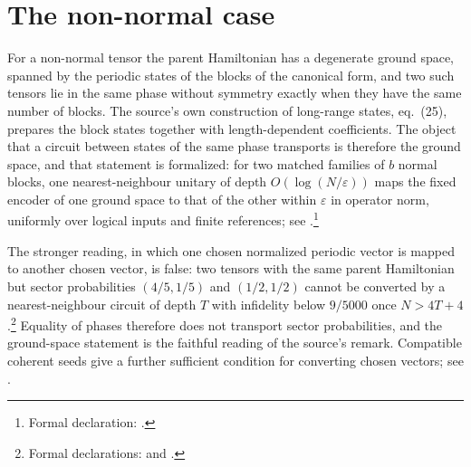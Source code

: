 \documentclass{article}
\begin{document}
\section{The non-normal case}
For a non-normal tensor the parent Hamiltonian has a degenerate ground space,
spanned by the periodic states of the blocks of the canonical form, and two
such tensors lie in the same phase without symmetry exactly when they have the
same number of blocks. The source's own construction of long-range states,
eq.~(25), prepares the block states together with length-dependent
coefficients. The object that a circuit between states of the same phase
transports is therefore the ground space, and that statement is formalized:
for two matched families of $b$ normal blocks, one nearest-neighbour unitary
of depth $O(\log(N/\varepsilon))$ maps the fixed encoder of one ground space
to that of the other within $\varepsilon$ in operator norm, uniformly over
logical inputs and finite references; see
\cite{gap:mswc24_coherent_sector_encoder_scope}.\footnote{Formal declaration:
    .}

The stronger reading, in which one chosen normalized periodic vector is mapped
to another chosen vector, is false: two tensors with the same parent
Hamiltonian but sector probabilities $(4/5,1/5)$ and $(1/2,1/2)$ cannot be
converted by a nearest-neighbour circuit of depth $T$ with infidelity below
$9/5000$ once $N>4T+4$.\footnote{Formal declarations:
     and
    .}
Equality of phases therefore does not transport sector probabilities, and the
ground-space statement is the faithful reading of the source's remark.
Compatible coherent seeds give a further sufficient condition for converting
chosen vectors; see \cite{gap:mswc24_same_phase_compatible_seed}.



\end{document}
